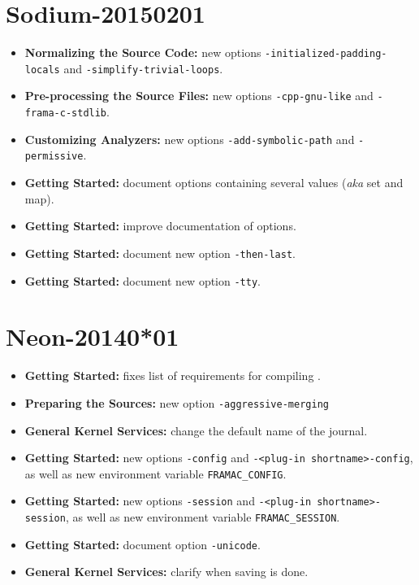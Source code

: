 \section*{Sodium-20150201}
\begin{itemize}
\item \textbf{Normalizing the Source Code:} new options
  \texttt{-initialized-padding-locals} and \texttt{-simplify-trivial-loops}.
\item \textbf{Pre-processing the Source Files:} new options
  \texttt{-cpp-gnu-like} and \texttt{-frama-c-stdlib}.
\item \textbf{Customizing Analyzers:} new options
  \texttt{-add-symbolic-path} and \texttt{-permissive}.
\item \textbf{Getting Started:} document options containing several values
  (\emph{aka} set and map).
\item \textbf{Getting Started:} improve documentation of options.
\item \textbf{Getting Started:} document new option \texttt{-then-last}.
\item \textbf{Getting Started:} document new option \texttt{-tty}.
\end{itemize}

\section*{Neon-20140*01}
\begin{itemize}
\item \textbf{Getting Started:} fixes list of requirements 
  for compiling \FramaC.
\item \textbf{Preparing the Sources:} new option \texttt{-aggressive-merging}
\item \textbf{General Kernel Services:} change the default name of the journal.
\item \textbf{Getting Started:} 
  new options \texttt{-config} and \texttt{-<plug-in shortname>-config}, as
  well as new environment variable \texttt{FRAMAC\_CONFIG}.
\item \textbf{Getting Started:} 
  new options \texttt{-session} and \texttt{-<plug-in shortname>-session}, as
  well as new environment variable \texttt{FRAMAC\_SESSION}.
\item \textbf{Getting Started:} document option \texttt{-unicode}.
\item \textbf{General Kernel Services:} clarify when saving is done.
\end{itemize}


